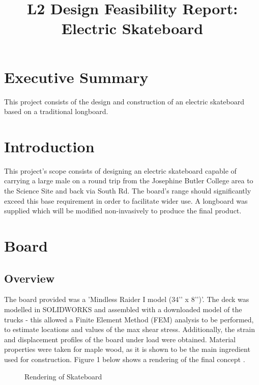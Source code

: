 \documentclass[journal,10pt]{IEEEtran}
\title{ 
\begin{huge}
\textbf{L2 Design Feasibility Report: Electric Skateboard} 
\end{huge} }
\begin{document}
\maketitle
\section{Executive Summary}
        This project consists of the design and construction of an electric skateboard based on a traditional longboard.
    
\section{Introduction}
        This project's scope consists of designing an electric skateboard capable of carrying a large male on a round trip from the Josephine Butler College area to the Science Site and back via South Rd. The board's range should significantly exceed this base requirement in order to facilitate wider use. A longboard was supplied which will be modified non-invasively to produce the final product. 
\section{Board}
    \subsection{Overview}
        The board provided was a 'Mindless Raider I model (34’’ x 8’’)’\cite{boardModel}. The deck was modelled in SOLIDWORKS and assembled with a downloaded model of the trucks \cite{trucksCAD} - this allowed a Finite Element Method (FEM) analysis to be performed, to estimate locations and values of the max shear stress. Additionally, the strain and displacement profiles of the board under load were obtained. Material properties were taken for maple wood, as it is shown to be the main ingredient used for construction. Figure 1 below shows a rendering of the final concept \cite{shoesCAD}. 
        \begin{figure}[H]
                \centering
                \caption{
                Rendering of Skateboard}
                \label{fig:Board_Rendering}
            \end{figure} 
\end{document}
